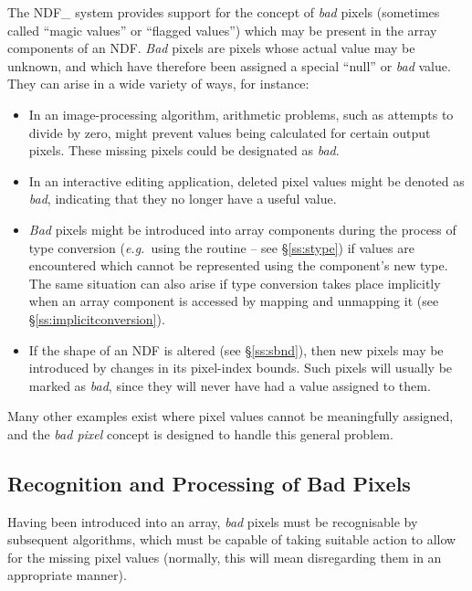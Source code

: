 \documentclass[twoside,11pt,nolof]{starlink}
\providecommand{\st}[1]{{\emph{#1}}}
\begin{document}
The NDF\_ system provides support for the concept of \st{bad\/} pixels
(sometimes called ``magic values'' or ``flagged values'') which may be present
in the array components of an NDF.
\st{Bad\/} pixels are pixels whose actual value may be unknown, and which
have therefore been assigned a special ``null'' or \st{bad\/} value.
They can arise in a wide variety of ways, for instance:

\begin{itemize}

\item
In an image-processing algorithm, arithmetic problems, such as attempts to
divide by zero, might prevent values being calculated for certain output
pixels.
These missing pixels could be designated as \st{bad}.

\item
In an interactive editing application, deleted pixel values might be denoted as
\st{bad}, indicating that they no longer have a useful value.

\item
\st{Bad\/} pixels might be introduced into array components during the
process of type conversion (\st{e.g.}\ using the routine  -- see
\S\ref{ss:stype}) if values are encountered which cannot be represented
using the component's new type.
The same situation can also arise if type conversion takes place implicitly
when an array component is accessed by mapping and unmapping it (see
\S\ref{ss:implicitconversion}).

\item
If the shape of an NDF is altered (see \S\ref{ss:sbnd}), then new pixels may
be introduced by changes in its pixel-index bounds.
Such pixels will usually be marked as \st{bad}, since they will never have
had a value assigned to them.

\end{itemize}

Many other examples exist where pixel values cannot be meaningfully
assigned, and the \st{bad pixel\/} concept is designed to handle this general
problem.

\subsection{Recognition and Processing of Bad Pixels}

Having been introduced into an array, \st{bad\/} pixels must be recognisable
by subsequent algorithms, which must be capable of taking suitable action to
allow for the missing pixel values (normally, this will mean disregarding
them in an appropriate manner).
\end{document}
